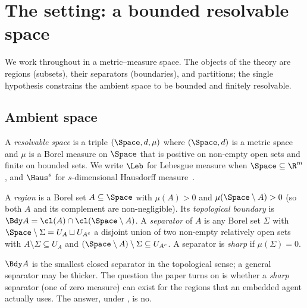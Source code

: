 
\section{The setting: a bounded resolvable space}
\label{sec:setting}

We work throughout in a metric--measure space. The objects of the theory are
regions (subsets), their separators (boundaries), and partitions; the single
hypothesis constrains the ambient space to be bounded and finitely resolvable.

\subsection{Ambient space}

\begin{definition}
\label{def:space}
A \emph{resolvable space} is a triple $(\Space,d,\mu)$ where $(\Space,d)$ is a
metric space and $\mu$ is a Borel measure on $\Space$ that is positive on
non-empty open sets and finite on bounded sets. We write $\Leb$ for Lebesgue
measure when $\Space\subseteq\R^{m}$, and $\Haus^{s}$ for $s$-dimensional
Hausdorff measure~\citep{federer1969,mattila1995}.
\end{definition}

\begin{definition}
\label{def:region}
A \emph{region} is a Borel set $A\subseteq\Space$ with
$\mu(A)>0$ and $\mu(\Space\setminus A)>0$ (so both $A$ and its complement are
non-negligible). Its \emph{topological boundary} is
$\Bdy A=\cl(A)\cap\cl(\Space\setminus A)$. A \emph{separator} of $A$ is any
Borel set $\Sigma$ with $\Space\setminus\Sigma=U_A\sqcup U_{A^c}$ a disjoint
union of two non-empty relatively open sets with $A\setminus\Sigma\subseteq
U_A$ and $(\Space\setminus A)\setminus\Sigma\subseteq U_{A^c}$. A separator is
\emph{sharp} if $\mu(\Sigma)=0$.
\end{definition}

\begin{remark}
$\Bdy A$ is the smallest closed separator in the topological sense; a general
separator may be thicker. The question the paper turns on is whether a
\emph{sharp} separator (one of zero measure) can exist for the regions that an
embedded agent actually uses. The answer, under , is no.
\end{remark}

